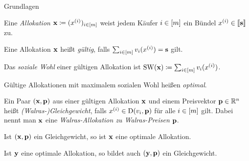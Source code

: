 \begin{frame}{Grundlagen}
	\begin{definition}[Allokation]
		Eine \emph{Allokation} $\mathbf{x}\coloneqq(x^{(i)})_{i\in\left[ m \right]}$ weist jedem Käufer $i\in\left[ m \right]$ ein Bündel $x^{(i)}\in\left\llbracket \mathbf{s} \right\rrbracket$ zu.
		
		Eine Allokation $\mathbf{x}$ heißt \emph{gültig}, falls $\sum_{i\in\left[ m \right]}v_i(x^{(i)}) = \mathbf{s}$ gilt.
		
		Das \emph{soziale Wohl} einer gültigen Allokation ist $\operatorname{SW}(\mathbf{x})\coloneqq \sum_{i\in\left[ m \right]} v_i(x^{(i)})$.
		
		Gültige Allokationen mit maximalem sozialen Wohl heißen \emph{optimal}.
	\end{definition}
	
	\begin{definition}
		Ein Paar $(\mathbf{x}, \mathbf{p})$ aus einer gültigen Allokation $\mathbf{x}$ und einem Preisvektor $\mathbf{p}\in\mathbb{R}^n$ heißt \emph{(Walras-)Gleichgewicht}, falls $x^{(i)}\in\operatorname{D}(v_i, \mathbf{p})$ für alle $i\in\left[ m \right]$ gilt.
		Dabei nennt man $\mathbf{x}$ eine \emph{Walras-Allokation zu Walras-Preisen} $\mathbf{p}$.
	\end{definition}

	\begin{lemma}[Wohlfahrtstheoreme]
		Ist $(\mathbf{x}, \mathbf{p})$ ein Gleichgewicht, so ist $\mathbf{x}$ eine optimale Allokation.
		
		Ist $\mathbf{y}$ eine optimale Allokation, so bildet auch $(\mathbf{y}, \mathbf{p})$ ein Gleichgewicht.
	\end{lemma}
\end{frame}



